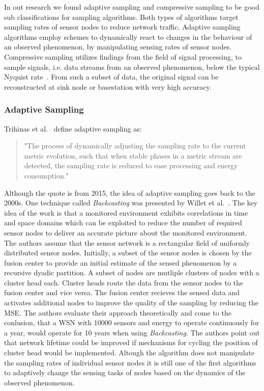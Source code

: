 In out research we found adaptive sampling and compressive sampling to be good
sub classifications for sampling algorithms. Both types of algorithms target
sampling rates of sensor nodes to reduce network traffic. Adaptive sampling
algorithms employ schemes to dynamically react to changes in the behaviour of
an observed phenomenon, by manipulating sensing rates of sensor nodes.
Compressive sampling utilizes findings from the field of signal processing, to
sample signals, i.e. data streams from an observed phenomenon, below the
typical Nyquist rate~\cite{candes2008introduction}. From such a subset of data,
the original signal can be reconstructed at sink node or basestation with very
high accuracy.

\subsubsection{Adaptive Sampling}
\label{sec:Adaptive Sampling}

Trihinas et al.~\cite{trihinas2015adam} define adaptive sampling as:

\begin{quote}
    "The process of dynamically adjusting the sampling rate to the current
    metric evolution, such that when stable phases in a metric stream are
    detected, the sampling rate is reduced to ease processing and energy
    consumption."
\end{quote}

\par
Although the quote is from 2015, the idea of adaptive sampling goes back to the
2000s. One technique called \textit{Backcasting} was presented by Willet et
al.~\cite{willett2004backcasting}. The key idea of the work is that a monitored
environment exhibits correlations in time and space domains which can be
exploited to reduce the number of required sensor nodes to deliver an accurate
picture about the monitored environment. The authors assume that the sensor
network is a rectangular field of uniformly distributed sensor nodes.
Initially, a subset of the sensor nodes is chosen by the fusion center to
provide an initial estimate of the sensed phenomenon by a recursive dyadic
partition. A subset of nodes are mutliple clusters of nodes with a cluster head
each. Cluster heads route the data from the sensor nodes to the fusion center
and vice versa. The fusion center recieves the sensed data and activates
additional nodes to improve the quality of the sampling by reducing the
\ac{MSE}. The authors evaluate their approach theoretically and come to the
conlusion, that a \ac{WSN} with 10000 sensors and energy to operate
continuously for a year, would operate for 10 years when using
\textit{Backcasting}. The authors point out that network lifetime could be
improved if mechanisms for cycling the position of cluster head would be
implemented. Altough the algorithm does not manipulate the sampling rates of
individual sensor nodes it is still one of the first algorithms to adaptively
change the sensing tasks of nodes based on the dynamics of the observed
phenomenon.

